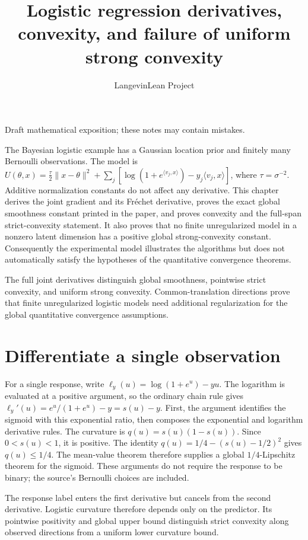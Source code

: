 \documentclass[11pt,a4paper]{article}
\title{\texorpdfstring{Logistic regression derivatives, convexity, and failure of uniform strong convexity}{Logistic regression derivatives, convexity, and failure of uniform strong convexity}}
\author{LangevinLean Project}
\date{}
\begin{document}
\maketitle
Draft mathematical exposition; these notes may contain mistakes.


The Bayesian logistic example has a Gaussian location prior and finitely many Bernoulli observations. The model is \(U(\theta,x)=\frac{\tau}{2}\|x-\theta\|^2+\sum_j[\log(1+e^{\langle v_j,x\rangle})-y_j\langle v_j,x\rangle]\), where \(\tau=\sigma^{-2}\). Additive normalization constants do not affect any derivative. This chapter derives the joint gradient and its Fréchet derivative, proves the exact global smoothness constant printed in the paper, and proves convexity and the full-span strict-convexity statement. It also proves that no finite unregularized model in a nonzero latent dimension has a positive global strong-convexity constant. Consequently the experimental model illustrates the algorithms but does not automatically satisfy the hypotheses of the quantitative convergence theorems.



The full joint derivatives distinguish global smoothness, pointwise strict convexity, and uniform strong convexity. Common-translation directions prove that finite unregularized logistic models need additional regularization for the global quantitative convergence assumptions.


\section{\texorpdfstring{Differentiate a single observation}{Differentiate a single observation}}


For a single response, write \(\ell_y(u)=\log(1+e^u)-yu\). The logarithm is evaluated at a positive argument, so the ordinary chain rule gives \(\ell_y'(u)=e^u/(1+e^u)-y=s(u)-y\). First, the argument identifies the sigmoid with this exponential ratio, then composes the exponential and logarithm derivative rules. The curvature is \(q(u)=s(u)(1-s(u))\). Since \(0<s(u)<1\), it is positive. The identity \(q(u)=1/4-(s(u)-1/2)^2\) gives \(q(u)\le1/4\). The mean-value theorem therefore supplies a global \(1/4\)-Lipschitz theorem for the sigmoid. These arguments do not require the response to be binary; the source's Bernoulli choices are included.



The response label enters the first derivative but cancels from the second derivative. Logistic curvature therefore depends only on the predictor. Its pointwise positivity and global upper bound distinguish strict convexity along observed directions from a uniform lower curvature bound.
\end{document}
